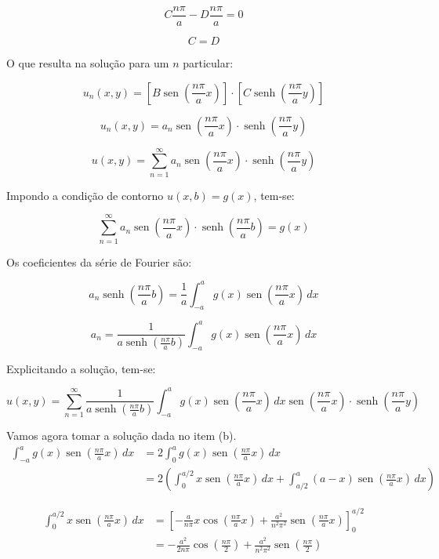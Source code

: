 \documentclass[12pt, a4paper, portuguese]{fphw}
\DeclareMathOperator{\sen}{sen}
\DeclareMathOperator{\senh}{senh}
\begin{document}
$$
C \frac{n \pi}{a} - D \frac{n \pi}{a} = 0
$$

$$
C = D
$$

O que resulta na solução para um $ n $ particular:

$$
u_n(x, y) = \left[
 B \sen \left( \frac{n \pi}{a} x \right)
\right]
\cdot
\left[
C \senh \left(
\frac{n \pi}{a} y
\right)
\right]
$$

$$
u_n(x, y) =
a_n \sen \left( \frac{n \pi}{a} x \right)
\cdot
\senh \left(
\frac{n \pi}{a} y
\right)
$$

$$
u(x, y) = \sum_{n=1}^{\infty}
a_n \sen \left( \frac{n \pi}{a} x \right)
\cdot
\senh \left(
\frac{n \pi}{a} y
\right)
$$

Impondo a condição de contorno $ u(x, b) = g(x) $, tem-se:

$$
\sum_{n=1}^{\infty}
a_n \sen \left( \frac{n \pi}{a} x \right)
\cdot
\senh \left(
\frac{n \pi}{a} b
\right) = g(x)
$$

Os coeficientes da série de Fourier são:

$$
a_n
\senh \left(
\frac{n \pi}{a} b
\right)
=
\frac{1}{a} \int_{-a}^{a} g(x) \sen \left( \frac{n \pi}{a} x \right)\, dx
$$

$$
a_n
=
\frac{1}{a \senh \left(
\frac{n \pi}{a} b
\right)} \int_{-a}^{a} g(x) \sen \left( \frac{n \pi}{a} x \right)\, dx
$$

Explicitando a solução, tem-se:

$$
u(x, y) = \sum_{n=1}^{\infty}
\frac{1}{a \senh \left(
\frac{n \pi}{a} b
\right)} \int_{-a}^{a} g(x) \sen \left( \frac{n \pi}{a} x \right)\, dx
\sen \left( \frac{n \pi}{a} x \right)
\cdot
\senh \left(
\frac{n \pi}{a} y
\right)
$$

Vamos agora tomar a solução dada no item (b).
$$
\begin{aligned}
\int_{-a}^{a} g(x) \sen \left( \frac{n \pi}{a} x \right)\, dx
&= 2\int_{0}^{a} g(x) \sen \left( \frac{n \pi}{a} x \right)\, dx \\
&= 2 \left(
\int_{0}^{a/2} x \sen \left( \frac{n \pi}{a} x \right)\, dx
+
\int_{a/2}^{a} \left( a - x \right) \sen \left( \frac{n \pi}{a} x \right)\, dx
\right)
\end{aligned}
$$

$$
\begin{aligned}
\int_{0}^{a/2} x \sen \left( \frac{n \pi}{a} x \right)\, dx
&=
\left[
-\frac{a}{n \pi}x
\cos \left( \frac{n\pi}{a}x \right)
+
\frac{a^2}{n^2 \pi^2}
\sen \left( \frac{n\pi}{a}x \right)
\right]_0^{a/2} \\
&=
-\frac{a^2}{2n \pi}
\cos \left( \frac{n\pi}{2} \right)
+
\frac{a^2}{n^2 \pi^2}
\sen \left( \frac{n\pi}{2} \right)
\end{aligned}
$$
\end{document}
